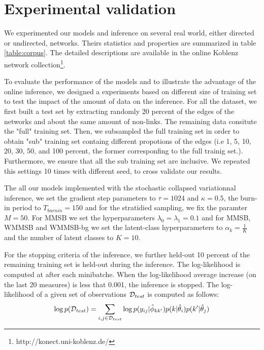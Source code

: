 \section{Experimental validation}
\label{sec:exps}

%
%


We experimented our models and inference on several real world, either directed or undirected, networks. Theirs statistics and properties are summarized in table \ref{table:corpus}. The detailed descriptions are available in the online Koblenz network collection\footnote{http://konect.uni-koblenz.de/}.

\begin{table}[h]
\bgroup
\def\arraystretch{1} %
	
\egroup
\label{table:corpus}
\end{table}



%
%
To evaluate the performance of the models and to illustrate the advantage of the online inference, we designed a experiments based on different size of training set to test the impact of the amount of data on the inference. For all the dataset, we first built a test set  by extracting randomly 20 percent of the edges of the networks and about the same amount of non-links. The remaining data consitute the "full" training set. Then, we subsampled the full training set in order to obtain "sub" training set containg different propotions of the edges (i.e 1, 5, 10, 20, 30, 50, and 100 percent, the former corresponfing to the full trainig set.). Furthermore, we ensure that all the sub training set are inclusive. We repeated this settings 10 times with different seed, to cross validate our results.

The all our models implemented with the stochastic collapsed variationnal inference, we set the gradient step parameters to $\tau=1024$ and $\kappa=0.5$, the burn-in period to $T_{burnin}=150$ and for the stratidied sampling, we fix the paramter $M=50$. For MMSB we set the hyperparameters $\lambda_0=\lambda_1=0.1$ and for MMSB, WMMSB and WMMSB-bg we set the latent-class hyperparameters to $\alpha_k=\frac{1}{K}$ and the number of latent classes to $K=10$.

For the stopping criteria of the inference, we further held-out 10 percent of the remaining training set is held-out during the inference. The log-likelihood is computed at after each minibatche. When the log-likelihood average increase (on the last 20 measures) is less that 0.001, the inference is stopped. The log-likelihood of a  given set of observations $\mathcal{D}_{test}$  is computed as follows:
\begin{equation*}
\log p(\mathcal{D}_{test}) = \sum_{i,j \in \mathcal{D}_{test}} \log p(y_{ij} | \hat\phi_{kk'}) p(k|\hat\theta_i) p(k'|\hat\theta_j)
\end{equation*}



